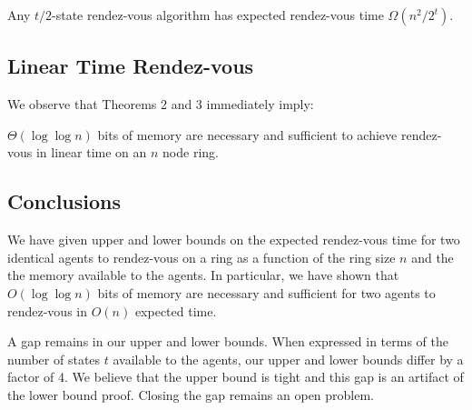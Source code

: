 \documentclass[lotsofwhite]{patmorin}
\newcommand{\E}{\mathrm{E}}
\begin{document}
\begin{thm}
Any $t/2$-state rendez-vous algorithm has expected rendez-vous time
$\Omega(n^2/2^{t})$.
\end{thm}

\subsection{Linear Time Rendez-vous}

We observe that Theorems 2 and 3 immediately imply:

\begin{thm}
$\Theta( \log \log n)$ bits of memory are necessary and sufficient to 
achieve rendez-vous in linear time on an $n$ node ring.
\end{thm}

\subsection{Conclusions}

We have given upper and lower bounds on the expected rendez-vous time
for two identical agents to rendez-vous on a ring as a function of the
ring size $n$ and the the memory available to the agents.  In
particular, we have shown that $O(\log\log n)$ bits of memory are
necessary and sufficient for two agents to rendez-vous in $O(n)$
expected time.

A gap remains in our upper and lower bounds.  When expressed in terms
of the number of states $t$ available to the agents, our upper and
lower bounds differ by a factor of 4.  We believe that the upper bound
is tight and this gap is an artifact of the lower bound proof.
Closing the gap remains an open problem.




\end{document}
